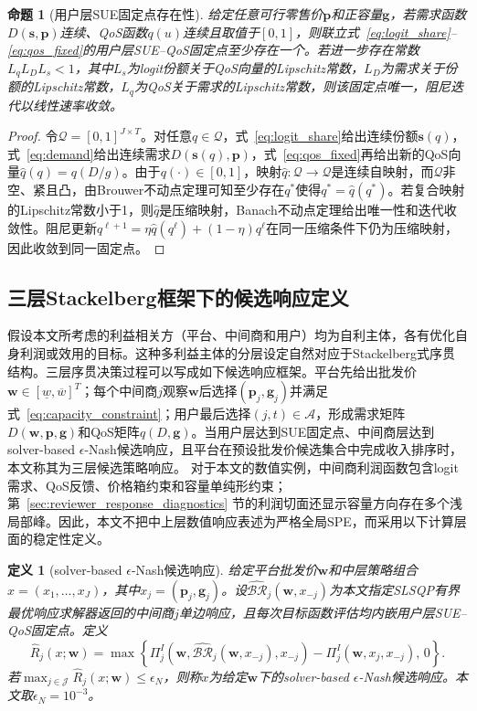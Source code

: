 \documentclass[UTF8,11pt]{ctexart}
\newtheorem{proposition}{命题}
\newtheorem{definition}{定义}
\newcommand{\qos}{q}
\newcommand{\J}{\mathcal{J}}
\newcommand{\A}{\mathcal{A}}
\newcommand{\D}{D}
\newcommand{\w}{\boldsymbol{w}}
\newcommand{\p}{\boldsymbol{p}}
\newcommand{\g}{\boldsymbol{g}}
\begin{document}
\begin{proposition}[用户层SUE固定点存在性]
\label{prop:sue_fixed_point}
给定任意可行零售价$\p$和正容量$\g$，若需求函数$\D(\boldsymbol{s},\p)$连续、QoS函数$\qos(u)$连续且取值于$[0,1]$，则联立式~\eqref{eq:logit_share}--\eqref{eq:qos_fixed}的用户层SUE--QoS固定点至少存在一个。若进一步存在常数$L_\qos L_D L_s<1$，其中$L_s$为logit份额关于QoS向量的Lipschitz常数，$L_D$为需求关于份额的Lipschitz常数，$L_\qos$为QoS关于需求的Lipschitz常数，则该固定点唯一，阻尼迭代以线性速率收敛。
\end{proposition}

\begin{proof}
令$\mathcal{Q}=[0,1]^{J\times T}$。对任意$q\in\mathcal{Q}$，式~\eqref{eq:logit_share}给出连续份额$\boldsymbol{s}(q)$，式~\eqref{eq:demand}给出连续需求$\D(\boldsymbol{s}(q),\p)$，式~\eqref{eq:qos_fixed}再给出新的QoS向量$\widehat q(q)=\qos(\D/g)$。由于$\qos(\cdot)\in[0,1]$，映射$\widehat q:\mathcal{Q}\to\mathcal{Q}$是连续自映射，而$\mathcal{Q}$非空、紧且凸，由Brouwer不动点定理可知至少存在$q^*$使得$q^*=\widehat q(q^*)$。若复合映射的Lipschitz常数小于1，则$\widehat q$是压缩映射，Banach不动点定理给出唯一性和迭代收敛性。阻尼更新$q^{\ell+1}=\eta\widehat q(q^\ell)+(1-\eta)q^\ell$在同一压缩条件下仍为压缩映射，因此收敛到同一固定点。
\end{proof}

\subsection{三层Stackelberg框架下的候选响应定义}
\label{sec:three_level_game}

假设本文所考虑的利益相关方（平台、中间商和用户）均为自利主体，各有优化自身利润或效用的目标。这种多利益主体的分层设定自然对应于Stackelberg式序贯结构。三层序贯决策过程可以写成如下候选响应框架。平台先给出批发价$\w\in[\underline w,\overline w]^T$；每个中间商$j$观察$\w$后选择$(\p_j,\g_j)$并满足式~\eqref{eq:capacity_constraint}；用户最后选择$(j,t)\in\A$，形成需求矩阵$\D(\w,\p,\g)$和QoS矩阵$q(\D,\g)$。当用户层达到SUE固定点、中间商层达到solver-based $\epsilon$-Nash候选响应，且平台在预设批发价候选集合中完成收入排序时，本文称其为三层候选策略响应。
对于本文的数值实例，中间商利润函数包含logit需求、QoS反馈、价格箱约束和容量单纯形约束；第~\ref{sec:reviewer_response_diagnostics} 节的利润切面还显示容量方向存在多个浅局部峰。因此，本文不把中上层数值响应表述为严格全局SPE，而采用以下计算层面的稳定性定义。

\begin{definition}[solver-based $\epsilon$-Nash候选响应]
\label{def:solver_eps_nash}
给定平台批发价$\w$和中层策略组合$x=(x_1,\ldots,x_J)$，其中$x_j=(\p_j,\g_j)$。设$\widehat{\mathcal{BR}}_j(\w,x_{-j})$为本文指定SLSQP有界最优响应求解器返回的中间商$j$单边响应，且每次目标函数评估均内嵌用户层SUE--QoS固定点。定义
\begin{equation}
  \widehat R_j(x;\w)=
  \max\left\{
  \Pi^I_j(\w,\widehat{\mathcal{BR}}_j(\w,x_{-j}),x_{-j})
  -\Pi^I_j(\w,x_j,x_{-j}),\,0
  \right\}.
  \label{eq:solver_eps_regret}
\end{equation}
若$\max_{j\in\J}\widehat R_j(x;\w)\le \epsilon_N$，则称$x$为给定$\w$下的solver-based $\epsilon$-Nash候选响应。本文取$\epsilon_N=10^{-3}$。
\end{definition}
\end{document}
